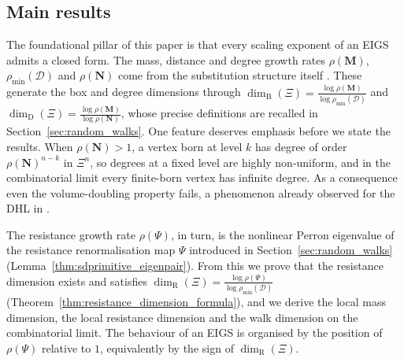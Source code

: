 \documentclass{article}
\theoremstyle{plain}
\theoremstyle{definition}
\newcommand{\dimbox}{\dim_\mathrm{B}}
\newcommand{\dimdeg}{\dim_\mathrm{D}}
\newcommand{\dimresis}{\dim_\mathrm{R}}
\begin{document}
\subsection{Main results}\label{subsec:main_results}

The foundational pillar of this paper is that every scaling exponent of an EIGS admits a closed form.
The mass, distance and degree growth rates $\rho(\mathbf M)$, $\rho_{\min}(\mathcal D)$ and $\rho(\mathbf N)$ come from the substitution structure itself \cite{neroli2024fractal,li2024on}.
These generate the box and degree dimensions through $\dimbox(\Xi)=\frac{\log\rho(\mathbf M)}{\log\rho_{\min}(\mathcal D)}$ and $\dimdeg(\Xi)=\frac{\log\rho(\mathbf M)}{\log\rho(\mathbf N)}$, whose precise definitions are recalled in Section~\ref{sec:random_walks}.
One feature deserves emphasis before we state the results.
When $\rho(\mathbf N)>1$, a vertex born at level $k$ has degree of order $\rho(\mathbf N)^{n-k}$ in $\Xi^n$, so degrees at a fixed level are highly non-uniform, and in the combinatorial limit every finite-born vertex has infinite degree.
As a consequence even the volume-doubling property fails, a phenomenon already observed for the DHL in \cite{hambly2010diffusion}.


The resistance growth rate $\rho(\Psi)$, in turn, is the nonlinear Perron eigenvalue of the resistance renormalisation map $\Psi$ introduced in Section~\ref{sec:random_walks} (Lemma~\ref{thm:sdprimitive_eigenpair}).
From this we prove that the resistance dimension exists and satisfies $\dimresis(\Xi)=\frac{\log\rho(\Psi)}{\log\rho_{\min}(\mathcal D)}$ (Theorem~\ref{thm:resistance_dimension_formula}), and we derive the local mass dimension, the local resistance dimension and the walk dimension on the combinatorial limit.
The behaviour of an EIGS is organised by the position of $\rho(\Psi)$ relative to $1$, equivalently by the sign of $\dimresis(\Xi)$.
\end{document}

